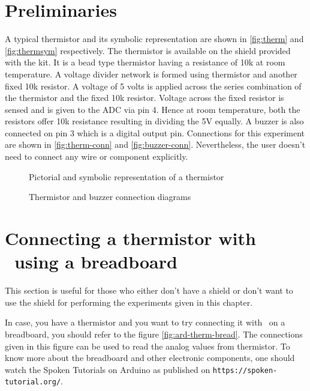 \section{Preliminaries}
A typical thermistor and its symbolic representation are shown in
\ref{fig:therm} and \ref{fig:thermsym} respectively. The thermistor is
available on the shield provided with the kit.  It is a bead type
thermistor having a resistance of 10k at room temperature. A voltage
divider network is formed using thermistor and another fixed 10k
resistor. A voltage of 5 volts is applied across the series
combination of the thermistor and the fixed 10k resistor. Voltage
across the fixed resistor is sensed and is given to the ADC via pin
4. Hence at room temperature, both the resistors offer 10k resistance
resulting in dividing the 5V equally. A buzzer is also connected on
pin 3 which is a digital output pin.
Connections for this experiment are shown in \ref{fig:therm-conn}
and \ref{fig:buzzer-conn}.  Nevertheless, the user doesn't need to
connect any wire or component explicitly.


\begin{figure}
\centering
{} \hfill
{}
\caption{Pictorial and symbolic representation of a thermistor}
\end{figure}


\begin{figure}
\centering
{} \hfill
{}
\caption{Thermistor and buzzer connection diagrams}
\end{figure}

\section{Connecting a thermistor with \arduino\ using a breadboard}
This section is useful for those who either don't have a shield or don't want to use the shield
for performing the experiments given in this chapter. 

In case, you have a thermistor and you want to try connecting it with \arduino\ on a breadboard, you should 
refer to the figure \ref{fig:ard-therm-bread}. The connections given in this 
figure can be used to read the analog values from thermistor. To know more about the 
breadboard and other electronic components, one should watch the Spoken Tutorials on Arduino as published on 
  {\tt https://spoken-tutorial.org/}. 


